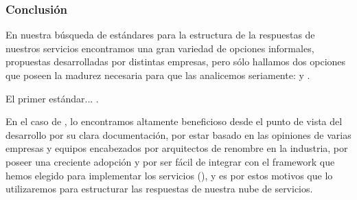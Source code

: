 \subsubsection{Conclusión}

En nuestra búsqueda de estándares para la estructura de la respuestas de nuestros servicios encontramos una gran variedad de opciones informales, propuestas desarrolladas por distintas empresas, pero sólo hallamos dos opciones que poseen la madurez necesaria para que las analicemos seriamente:  y .

El primer estándar... .

En el caso de , lo encontramos altamente beneficioso desde el punto de vista del desarrollo por su clara documentación, por estar basado en las opiniones de varias empresas y equipos encabezados por arquitectos de renombre en la industria, por poseer una creciente adopción y por ser fácil de integrar con el framework que hemos elegido para implementar los servicios (), y es por estos motivos que lo utilizaremos para estructurar las respuestas de nuestra nube de servicios.
